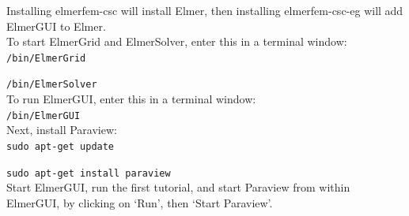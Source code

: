 Installing elmerfem-csc will install Elmer, then installing elmerfem-csc-eg will add ElmerGUI to Elmer.\\

To start ElmerGrid and ElmerSolver, enter this in a terminal window:\\

\texttt{/bin/ElmerGrid}

\texttt{/bin/ElmerSolver}\\

To run ElmerGUI, enter this in a terminal window:\\

\texttt{/bin/ElmerGUI}\\

Next, install Paraview:\\

\texttt{sudo apt-get update}

\texttt{sudo apt-get install paraview}\\

Start ElmerGUI, run the first tutorial, and start Paraview from within ElmerGUI, by clicking on `Run', then `Start Paraview'.










